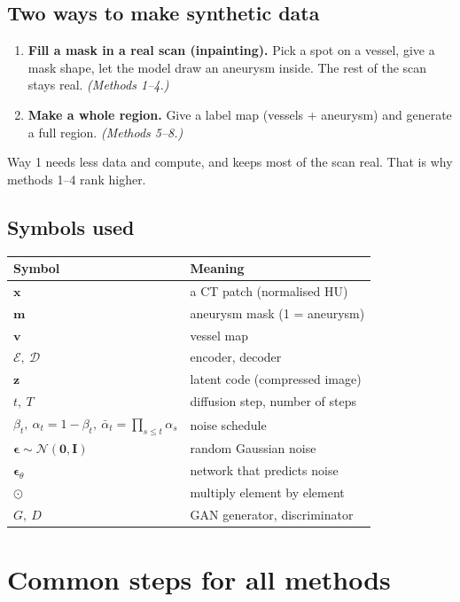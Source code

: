 \documentclass[11pt,a4paper,oneside]{report}
\newcommand{\x}{\bm{x}}
\newcommand{\z}{\bm{z}}
\newcommand{\m}{\bm{m}}
\newcommand{\eps}{\bm{\epsilon}}
\newcommand{\N}{\mathcal{N}}
\newcommand{\abar}{\bar{\alpha}}
\newcommand{\enc}{\mathcal{E}}
\newcommand{\dec}{\mathcal{D}}
\newcommand{\I}{\bm{I}}
\newcommand{\had}{\odot}
\begin{document}
\section{Two ways to make synthetic data}
\begin{enumerate}
  \item \textbf{Fill a mask in a real scan (inpainting).} Pick a spot on a vessel, give a mask shape, let the model draw an aneurysm inside. The rest of the scan stays real. \emph{(Methods 1--4.)}
  \item \textbf{Make a whole region.} Give a label map (vessels + aneurysm) and generate a full region. \emph{(Methods 5--8.)}
\end{enumerate}
Way 1 needs less data and compute, and keeps most of the scan real. That is why methods 1--4 rank higher.

\section{Symbols used}
\begin{center}
\small
\begin{tabular}{ll}
\toprule
\textbf{Symbol} & \textbf{Meaning} \\
\midrule
$\x$ & a CT patch (normalised HU) \\
$\m$ & aneurysm mask (1 = aneurysm) \\
$\bm v$ & vessel map \\
$\enc,\ \dec$ & encoder, decoder \\
$\z$ & latent code (compressed image) \\
$t,\ T$ & diffusion step, number of steps \\
$\beta_t,\ \alpha_t=1-\beta_t,\ \abar_t=\prod_{s\le t}\alpha_s$ & noise schedule \\
$\eps\sim\N(\bm 0,\I)$ & random Gaussian noise \\
$\eps_\theta$ & network that predicts noise \\
$\had$ & multiply element by element \\
$G,\ D$ & GAN generator, discriminator \\
\bottomrule
\end{tabular}
\end{center}

\chapter{Common steps for all methods}\label{ch:prep}
\end{document}

